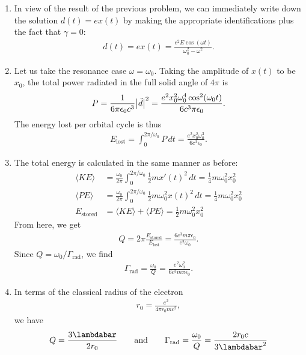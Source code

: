 \documentclass{article}
\theoremstyle{definition}
\newcommand{\f}[2]{\frac{#1}{#2}}
\begin{document}
\begin{enumerate}[label=\alph*)]
	\item In view of the result of the previous problem, we can immediately write down the solution $d(t) = ex(t)$ by making the appropriate identifications plus the fact that $\gamma=0$:
	\begin{align*}
	d(t) = ex(t) = \f{e^2 E\cos(\omega t)}{\omega_0^2 - \omega^2}.
	\end{align*}
	
	\item Let us take the resonance case $\omega = \omega_0$. Taking the amplitude of $x(t)$ to be $x_0$, the total power radiated in the full solid angle of $4\pi$ is 
	\begin{align*}
	P = \f{1}{6\pi \epsilon_0 c^3}\abs{\ddot d}^2 = \f{e^2 x_0^2 \omega_0^4 \cos^2(\omega_0 t)}{6 c^3 \pi \epsilon_0}.
	\end{align*}
	The energy lost per orbital cycle is thus
	\begin{align*}
	E_\text{lost} = \int_0^{2\pi/\omega_0} P\,dt = \f{e^2 x_0^2 \omega_0^3}{6c^3 \epsilon_0}.
	\end{align*}
	
	
	\item The total energy is calculated in the same manner as before:
	\begin{align*}
	\langle KE\rangle &= \f{\omega_0}{2\pi} \int_0^{2\pi/\omega_0} \f{1}{2}m x'(t)^2\,dt= \f{1}{4}m \omega_0^2 x_0^2  \\
	\langle PE \rangle &= \f{\omega_0}{2\pi}\int_0^{2\pi/\omega_0} \f{1}{2}m \omega_0^2 x(t)^2\,dt  = \f{1}{4}m \omega_0^2 x_0^2 \\
	E_\text{stored} &= \langle KE \rangle + \langle PE \rangle = \f{1}{2}m \omega_0^2 x_0^2
	\end{align*}
	From here, we get
	\begin{align*}
	Q = 2\pi \f{E_\text{stored}}{E_\text{lost}} = \f{6c^3 m\pi \epsilon_0}{e^2 \omega_0}.
	\end{align*}
	Since $Q = \omega_0 / \Gamma_{\text{rad}}$, we find
	\begin{align*}
	\Gamma_\text{rad} = \f{\omega_0}{Q} = \f{e^2 \omega_0^2}{6c^3 m \pi \epsilon_0}.
	\end{align*} 
	
	\item In terms of the classical radius of the electron
	\begin{align*}
	r_0 = \f{e^2}{4\pi \epsilon_0 mc^2}, 
	\end{align*}
	we have
	\begin{align*}
	Q = \f{3\lambdabar}{2r_0} \quad\quad \text{and}\quad\quad \Gamma_\text{rad} = \f{\omega_0}{Q} = \f{2r_0c}{3\lambdabar^2}
	\end{align*}
	

\end{enumerate}
\end{document}
